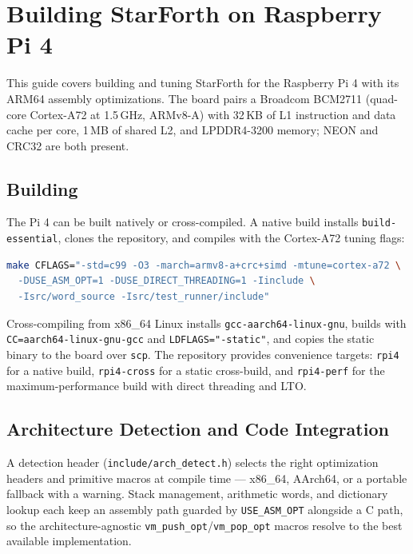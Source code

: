
\section{Building StarForth on Raspberry Pi 4}

This guide covers building and tuning StarForth for the Raspberry Pi 4 with its
ARM64 assembly optimizations. The board pairs a Broadcom BCM2711 (quad-core
Cortex-A72 at 1.5\,GHz, ARMv8-A) with 32\,KB of L1 instruction and data cache
per core, 1\,MB of shared L2, and LPDDR4-3200 memory; NEON and CRC32 are both
present.

\subsection{Building}

The Pi 4 can be built natively or cross-compiled. A native build installs
\texttt{build-essential}, clones the repository, and compiles with the
Cortex-A72 tuning flags:

\begin{lstlisting}[language=bash]
make CFLAGS="-std=c99 -O3 -march=armv8-a+crc+simd -mtune=cortex-a72 \
  -DUSE_ASM_OPT=1 -DUSE_DIRECT_THREADING=1 -Iinclude \
  -Isrc/word_source -Isrc/test_runner/include"
\end{lstlisting}

Cross-compiling from x86\_64 Linux installs
\texttt{gcc-aarch64-linux-gnu}, builds with \texttt{CC=aarch64-linux-gnu-gcc}
and \texttt{LDFLAGS="-static"}, and copies the static binary to the board over
\texttt{scp}. The repository provides convenience targets: \texttt{rpi4} for a
native build, \texttt{rpi4-cross} for a static cross-build, and
\texttt{rpi4-perf} for the maximum-performance build with direct threading and
LTO.

\subsection{Architecture Detection and Code Integration}

A detection header (\texttt{include/arch\_detect.h}) selects the right
optimization headers and primitive macros at compile time --- x86\_64,
AArch64, or a portable fallback with a warning. Stack management, arithmetic
words, and dictionary lookup each keep an assembly path guarded by
\texttt{USE\_ASM\_OPT} alongside a C path, so the architecture-agnostic
\texttt{vm\_push\_opt}/\texttt{vm\_pop\_opt} macros resolve to the best
available implementation.

